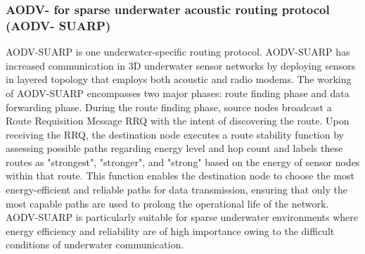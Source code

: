 \documentclass[]{nsm-thesis}
\begin{document}
\subsubsection{AODV- for sparse underwater acoustic routing protocol
(AODV- SUARP)}
AODV-SUARP is one underwater-specific routing protocol. AODV-SUARP has increased communication in 3D underwater sensor networks by deploying sensors in layered topology that employs both acoustic and radio modems. The working of AODV-SUARP encompasses two major phases: route finding phase and data forwarding phase. During the route finding phase, source nodes broadcast a Route Requisition Message RRQ with the intent of discovering the route. Upon receiving the RRQ, the destination node executes a route stability function by assessing possible paths regarding energy level and hop count and labels these routes as "strongest", "stronger", and "strong" based on the energy of sensor nodes within that route. This function enables the destination node to choose the most energy-efficient and reliable paths for data transmission, ensuring that only the most capable paths are used to prolong the operational life of the network. AODV-SUARP is particularly suitable for sparse underwater environments where energy efficiency and reliability are of high importance owing to the difficult conditions of underwater communication.\cite{9907973}
\end{document}
